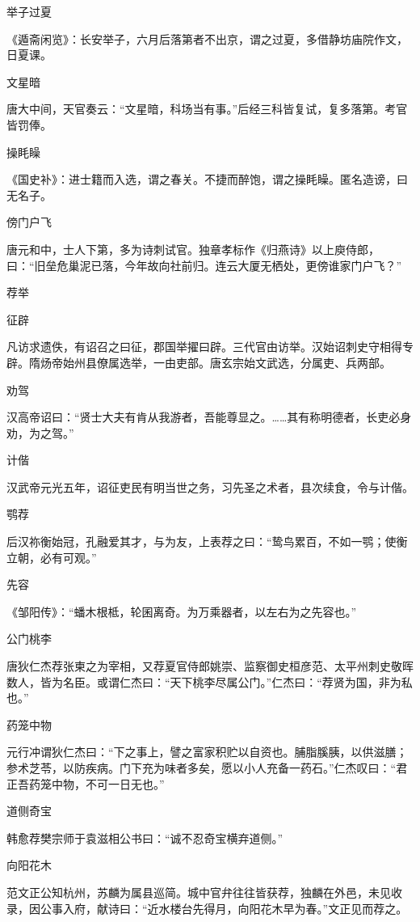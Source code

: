 \documentclass[a4paper,12pt,UTF8,twoside]{ctexbook}
\begin{document}
    举子过夏
    
    《遁斋闲览》：长安举子，六月后落第者不出京，谓之过夏，多借静坊庙院作文，日夏课。
    
    文星暗
    
    唐大中间，天官奏云：“文星暗，科场当有事。”后经三科皆复试，复多落第。考官皆罚俸。
    
    操眊矂
    
    《国史补》：进士籍而入选，谓之春关。不捷而醉饱，谓之操眊矂。匿名造谤，曰无名子。
    
    傍门户飞
    
    唐元和中，士人下第，多为诗刺试官。独章孝标作《归燕诗》以上庾侍郎，曰：“旧垒危巢泥已落，今年故向社前归。连云大厦无栖处，更傍谁家门户飞？”
    
    荐举
    
    征辟
    
    凡访求遗佚，有诏召之曰征，郡国举擢曰辟。三代官由访举。汉始诏刺史守相得专辟。隋炀帝始州县僚属选举，一由吏部。唐玄宗始文武选，分属吏、兵两部。
    
    劝驾
    
    汉高帝诏曰：“贤士大夫有肯从我游者，吾能尊显之。……其有称明德者，长吏必身劝，为之驾。”
    
    计偕
    
    汉武帝元光五年，诏征吏民有明当世之务，习先圣之术者，县次续食，令与计偕。
    
    鹗荐
    
    后汉祢衡始冠，孔融爱其才，与为友，上表荐之曰：“鸷鸟累百，不如一鹗；使衡立朝，必有可观。”
    
    先容
    
    《邹阳传》：“蟠木根柢，轮囷离奇。为万乘器者，以左右为之先容也。”
    
    公门桃李
    
    唐狄仁杰荐张柬之为宰相，又荐夏官侍郎姚崇、监察御史桓彦范、太平州刺史敬晖数人，皆为名臣。或谓仁杰曰：“天下桃李尽属公门。”仁杰曰：“荐贤为国，非为私也。”
    
    药笼中物
    
    元行冲谓狄仁杰曰：“下之事上，譬之富家积贮以自资也。脯脂膎胰，以供滋膳；参术芝苓，以防疾病。门下充为味者多矣，愿以小人充备一药石。”仁杰叹曰：“君正吾药笼中物，不可一日无也。”
    
    道侧奇宝
    
    韩愈荐樊宗师于袁滋相公书曰：“诚不忍奇宝横弃道侧。”
    
    向阳花木
    
    范文正公知杭州，苏麟为属县巡简。城中官弁往往皆获荐，独麟在外邑，未见收录，因公事入府，献诗曰：“近水楼台先得月，向阳花木早为春。”文正见而荐之。
    
\end{document}
